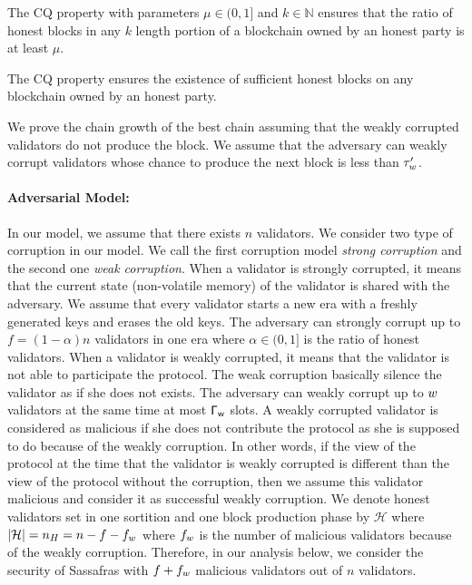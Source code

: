 \begin{definition}\label{def:cq}
	The CQ property with parameters $ \mu \in (0,1]  $ and $ k \in \mathbb{N} $ ensures that the ratio of honest blocks in any $ k $ length portion of a blockchain owned by an honest party is at least $ \mu $.
\end{definition} 

The CQ property ensures the existence of sufficient honest blocks on  any blockchain owned by an honest party.

We prove the chain growth of the best chain assuming that the weakly corrupted validators do not produce the block. We assume that the adversary can weakly corrupt validators whose chance to produce the next block is less than $ \tau_w' $.
\paragraph{Adversarial Model:} In our model, we assume that there exists $ n $ validators.  We consider two type of corruption in our model. We call the first corruption model \emph{strong corruption} and the second one \emph{weak corruption}. When a validator is strongly corrupted, it means that the current state (non-volatile memory) of the validator is shared with the adversary. We assume that every validator starts a new era with a freshly generated keys and erases the old keys. The adversary can strongly corrupt up to $ f = (1-\alpha)n $ validators in one era where $ \alpha \in (0,1] $ is the ratio of honest validators.  
When a validator is weakly corrupted, it means that the validator is not able to participate the protocol. The weak corruption basically silence the validator as if she does not exists. The adversary can weakly corrupt up to $ w $ validators at the same time at most  $ \mathsf{\Gamma_{w}} $ slots. A weakly corrupted validator is considered as malicious if she does not contribute the protocol as she is supposed to do because of the weakly corruption.  In other words, if the view of the protocol at the time that the validator is weakly corrupted is different than the view of the protocol without the corruption, then we assume this validator malicious and consider it as successful weakly corruption.  We denote honest validators set in one sortition and one block production phase by $ \mathcal{H} $ where $ |\mathcal{H}| = n_H = n-f - f_{w}$ where $ f_{w} $ is the number of malicious validators because of the weakly corruption.  Therefore, in our analysis below, we consider the security of Sassafras with $ f + f_{w}$ malicious validators out of $ n $ validators. 


